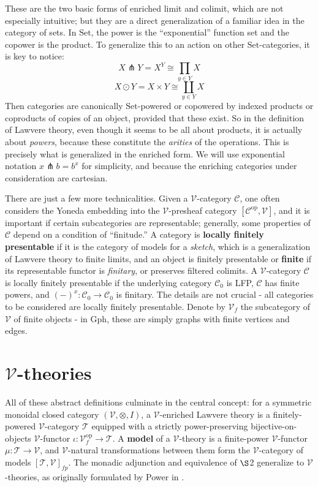 \documentclass[a4paper,UKenglish]{article}
\theoremstyle{definition}
\newcommand{\Gph}{\mathrm{Gph}}
\newcommand{\Set}{\mathrm{Set}}
\newcommand{\op}{\mathrm{op}}
\newcommand{\V}{\mathscr{V}}
\newcommand{\C}{\mathscr{C}}
\newcommand{\T}{\mathscr{T}}
\newcommand{\pfk}{\pitchfork}
\begin{document}
These are the two basic forms of enriched limit and colimit, which are not especially intuitive; but they are a direct generalization of a familiar idea in the category of sets. In $\Set$, the power is the ``exponential'' function set and the copower is the product. To generalize this to an action on other $\Set$-categories, it is key to notice: $$X \pfk Y = X^Y \cong \prod_{y\in Y}X$$ $$X \odot Y = X \times Y \cong \coprod_{y\in Y}X$$ Then categories are canonically $\Set$-powered or copowered by indexed products or coproducts of copies of an object, provided that these exist. So in the definition of Lawvere theory, even though it seems to be all about products, it is actually about \textit{powers}, because these constitute the \textit{arities} of the operations. This is precisely what is generalized in the enriched form. We will use exponential notation $x\pfk b = b^x$ for simplicity, and because the enriching categories under consideration are cartesian.

There are just a few more technicalities. Given a $\V$-category $\C$, one often considers the Yoneda embedding into the $\V$-presheaf category $[\C^\op, \V]$, and it is important if certain subcategories are representable; generally, some properties of $\C$ depend on a condition of ``finitude.'' \cite{finite} A category is \textbf{locally finitely presentable} if it is the category of models for a \textit{sketch}, which is a generalization of Lawvere theory to finite limits, and an object is finitely presentable or \textbf{finite} if its representable functor is \textit{finitary}, or preserves filtered colimits. A $\V$-category $\C$ is locally finitely presentable if the underlying category $\C_0$ is LFP, $\C$ has finite powers, and $(-)^x: \C_0 \to \C_0$ is finitary. The details are not crucial - all categories to be considered are locally finitely presentable. Denote by $\V_f$ the subcategory of $\V$ of finite objects - in $\Gph$, these are simply graphs with finite vertices and edges.\\

\section{$\V$-theories}
All of these abstract definitions culminate in the central concept: for a symmetric monoidal closed category $(\V,\otimes,I)$, a $\V$-enriched Lawvere theory is a finitely-powered $\V$-category $\T$ equipped with a strictly power-preserving bijective-on-objects $\V$-functor $\iota:\V_f^\op \to \T$. A \textbf{model} of a $\V$-theory is a finite-power $\V$-functor $\mu:\T \to \V$, and $\V$-natural transformations between them form the $\V$-category of models $[\T,\V]_{fp}$. The monadic adjunction and equivalence of $\S$2 generalize to $\V$-theories, as originally formulated by Power in \cite{power}.
\end{document}
